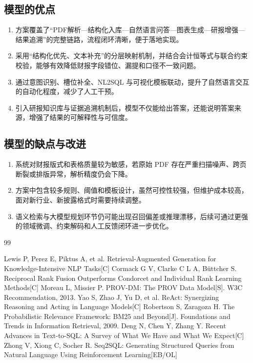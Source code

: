\documentclass[withoutpreface,bwprint]{cumcmthesis} %
\begin{document}
\subsection{模型的优点}
\begin{enumerate}
	\item 方案覆盖了“PDF解析—结构化入库—自然语言问答—图表生成—研报增强—结果追溯”的完整链路，流程闭环清晰，便于落地实现。
	\item 采用“结构化优先、文本补充”的分层映射机制，并结合会计恒等式与联合约束校验，能够有效降低财报字段错位、漏提和口径不一致问题。
	\item 通过意图识别、槽位补全、NL2SQL 与可视化模板联动，提升了自然语言交互的自动化程度，减少了人工干预。
	\item 引入研报知识库与证据追溯机制后，模型不仅能给出答案，还能说明答案来源，增强了结果的可解释性与可信度。
\end{enumerate}

\subsection{模型的缺点与改进}
\begin{enumerate}
	\item 系统对财报版式和表格质量较为敏感，若原始 PDF 存在严重扫描噪声、跨页断裂或排版异常，解析精度仍会下降。
	\item 方案中包含较多规则、阈值和模板设计，虽然可控性较强，但维护成本较高，面对新行业、新披露格式时需要持续调整。
	\item 语义检索与大模型规划环节仍可能出现召回偏差或推理漂移，后续可通过更强的领域微调、约束解码和人工反馈闭环进一步优化。
\end{enumerate}

\newpage
\begin{thebibliography}{99}

	Lewis P, Perez E, Piktus A, et al. Retrieval-Augmented Generation for Knowledge-Intensive NLP Tasks[C]
	 Cormack G V, Clarke C L A, Büttcher S. Reciprocal Rank Fusion Outperforms Condorcet and Individual Rank Learning Methods[C]
	 Moreau L, Missier P. PROV-DM: The PROV Data Model[S]. W3C Recommendation, 2013. 
	 Yao S, Zhao J, Yu D, et al. ReAct: Synergizing Reasoning and Acting in Language Models[C] 
	 Robertson S, Zaragoza H. The Probabilistic Relevance Framework: BM25 and Beyond[J]. Foundations and Trends in Information Retrieval, 2009.
	 Deng N, Chen Y, Zhang Y. Recent Advances in Text-to-SQL: A Survey of What We Have and What We Expect[C]
	 Zhong V, Xiong C, Socher R. Seq2SQL: Generating Structured Queries from Natural Language Using Reinforcement Learning[EB/OL]

\end{thebibliography}
\end{document}
